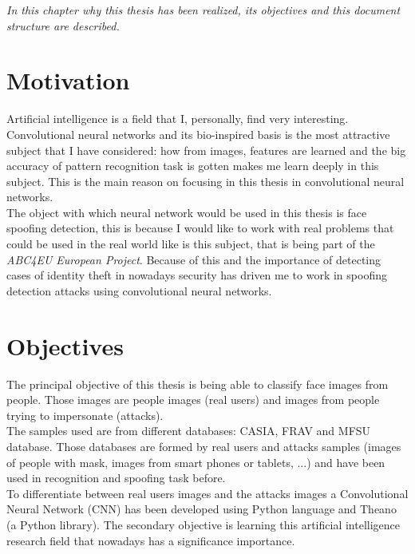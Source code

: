 \minitoc
\mtcskip

\begin{small}
\emph{In this chapter why this thesis has been realized, its objectives and this document structure are described.\\}
\end{small}
\section{Motivation}
Artificial intelligence is a field that I, personally, find very interesting. Convolutional neural networks and its bio-inspired basis is the most attractive subject that I have considered: how from images, features are learned and the big accuracy of pattern recognition task is gotten makes me learn deeply in this subject. This is the main reason on focusing in this thesis in convolutional neural networks.\\

The object with which neural network would be used in this thesis is face spoofing detection, this is because I would like to work with real problems that could be used in the real world like is this subject, that is being part of the \textit{ABC4EU European Project}. Because of this and the importance of detecting cases of identity theft in nowadays security has driven me to work in spoofing detection attacks using convolutional neural networks.

\section{Objectives}
The principal objective of this thesis is being able to classify face images from people. Those images are people images (real users) and images from people trying to impersonate (attacks).\\

The samples used are from different databases: CASIA, FRAV and MFSU database. Those databases are formed by real users and attacks samples (images of people with mask, images from smart phones or tablets, ...) and have been used in recognition and spoofing task before.\\

To differentiate between real users images and the attacks images a Convolutional Neural Network (CNN) has been developed using Python language and Theano (a Python library). The secondary objective is learning this artificial intelligence research field that nowadays has a significance importance.\\

